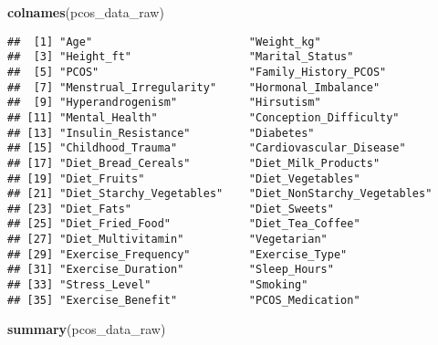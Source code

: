 \documentclass[
]{article}
\newenvironment{Shaded}{\begin{snugshade}}{\end{snugshade}}
\newcommand{\FunctionTok}[1]{\textcolor[rgb]{0.13,0.29,0.53}{\textbf{#1}}}
\newcommand{\NormalTok}[1]{#1}
\begin{document}
\begin{Shaded}
\begin{Highlighting}[]
\FunctionTok{colnames}\NormalTok{(pcos\_data\_raw)}
\end{Highlighting}
\end{Shaded}

\begin{verbatim}
##  [1] "Age"                        "Weight_kg"                 
##  [3] "Height_ft"                  "Marital_Status"            
##  [5] "PCOS"                       "Family_History_PCOS"       
##  [7] "Menstrual_Irregularity"     "Hormonal_Imbalance"        
##  [9] "Hyperandrogenism"           "Hirsutism"                 
## [11] "Mental_Health"              "Conception_Difficulty"     
## [13] "Insulin_Resistance"         "Diabetes"                  
## [15] "Childhood_Trauma"           "Cardiovascular_Disease"    
## [17] "Diet_Bread_Cereals"         "Diet_Milk_Products"        
## [19] "Diet_Fruits"                "Diet_Vegetables"           
## [21] "Diet_Starchy_Vegetables"    "Diet_NonStarchy_Vegetables"
## [23] "Diet_Fats"                  "Diet_Sweets"               
## [25] "Diet_Fried_Food"            "Diet_Tea_Coffee"           
## [27] "Diet_Multivitamin"          "Vegetarian"                
## [29] "Exercise_Frequency"         "Exercise_Type"             
## [31] "Exercise_Duration"          "Sleep_Hours"               
## [33] "Stress_Level"               "Smoking"                   
## [35] "Exercise_Benefit"           "PCOS_Medication"
\end{verbatim}

\begin{Shaded}
\begin{Highlighting}[]
\FunctionTok{summary}\NormalTok{(pcos\_data\_raw)}
\end{Highlighting}
\end{Shaded}
\end{document}
